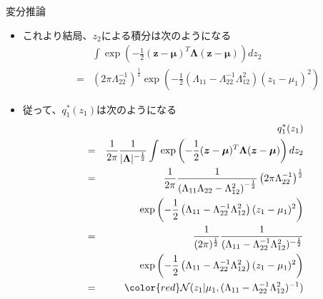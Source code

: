 \documentclass[dvipdfmx,notheorems,t]{beamer}
\begin{document}
\begin{frame}{変分推論}
\begin{itemize}
\begin{itemize}
		\item これより結局、$z_2$による積分は次のようになる
		\begin{eqnarray}
			&& \int \exp \left( -\frac{1}{2} (\bm{z} - \bm{\mu})^T \bm{\Lambda} (\bm{z} - \bm{\mu}) \right) dz_2 \nonumber \\
			&=& \left( 2\pi \Lambda_{22}^{-1} \right)^\frac{1}{2} \exp \left( -\frac{1}{2} \left( \Lambda_{11} - \Lambda_{22}^{-1} \Lambda_{12}^2 \right) (z_1 - \mu_1)^2 \right)
		\end{eqnarray}
		
		\item 従って、$q_1^*(z_1)$は次のようになる
		\begin{eqnarray}
			&& q_1^*(z_1) \nonumber \\
			&=& \frac{1}{2\pi} \frac{1}{|\bm{\Lambda}|^{-\frac{1}{2}}} \int \exp \left( -\frac{1}{2} (\bm{z} - \bm{\mu})^T \bm{\Lambda} (\bm{z} - \bm{\mu}) \right) dz_2 \\
			&=& \frac{1}{2\pi} \frac{1}{\left( \Lambda_{11} \Lambda_{22} - \Lambda_{12}^2 \right)^{-\frac{1}{2}}} \left( 2\pi \Lambda_{22}^{-1} \right)^\frac{1}{2} \nonumber \\
			&& \qquad \exp \left( -\frac{1}{2} \left( \Lambda_{11} - \Lambda_{22}^{-1} \Lambda_{12}^2 \right) (z_1 - \mu_1)^2 \right) \\
			&=& \frac{1}{(2\pi)^\frac{1}{2}} \frac{1}{(\Lambda_{11} - \Lambda_{22}^{-1} \Lambda_{12}^2)^{-\frac{1}{2}}} \nonumber \\
			&& \qquad \exp \left( -\frac{1}{2} \left( \Lambda_{11} - \Lambda_{22}^{-1} \Lambda_{12}^2 \right) (z_1 - \mu_1)^2 \right) \\
			&=& \color{red}\mathcal{N}(z_1 | \mu_1, (\Lambda_{11} - \Lambda_{22}^{-1} \Lambda_{12}^2)^{-1})\normalcolor
		\end{eqnarray}
		

\end{itemize}
\end{itemize}
\end{frame}
\end{document}
